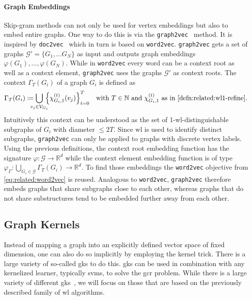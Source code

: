\paragraph{Graph Embeddings}
Skip-gram methods can not only be used for vertex embeddings but also to embed entire graphs.
One way to do this is via the \texttt{graph2vec}~\cite{Narayanan2017} method.
It is inspired by \texttt{doc2vec}~\cite{Le2014} which in turn is based on \texttt{word2vec}.
\texttt{graph2vec} gets a set of graphs $\mathcal{G}' = \{ G_1, \dots G_N \}$ as input and outputs graph embeddings $\varphi(G_1), \dots, \varphi(G_N)$.
While in \texttt{word2vec} every word can be a context root as well as a context element, \texttt{graph2vec} uses the graphs $\mathcal{G}'$ as context roots.
The context $\Gamma_T(G_i)$ of a graph $G_i$ is defined as
\begin{equation}
	\Gamma_T(G_i) \coloneqq \bigcup_{\mathclap{v_j \in \mathcal{V}_{G_i}}}\, {\left\{ \chi_{G_i, 1}^{(t)}(v_j) \right\}}_{t = 0}^T %
	\quad\text{with $T \in \mathbb{N}$ and $\chi_{G_i, 1}^{(t)}$ as in \cref{defn:related:wl1-refine}.}
\end{equation}
Intuitively this context can be understood as the set of 1-\acs{wl}-distinguishable subgraphs of $G_i$ with diameter $\leq 2T$.
Since \ac{wl} is used to identify distinct subgraphs, \texttt{graph2vec} can only be applied to graphs with discrete vertex labels.
Using the previous definitions, the context root embedding function has the signature $\varphi: \mathcal{G} \to \mathbb{R}^d$ while the context element embedding function is of type $\varphi_{\Gamma}: \bigcup_{G_i \in \mathcal{G}} \Gamma_T(G_i) \to \mathbb{R}^d$.
To find those embeddings the \texttt{word2vec} objective from \cref{eq:related:word2vec} is reused.
Analogous to \texttt{word2vec}, \texttt{graph2vec} therefore embeds graphs that share subgraphs close to each other, whereas graphs that do not share substructures tend to be embedded further away from each other.

\subsection{Graph Kernels}%
\label{sec:related:gcr:kernel}

Instead of mapping a graph into an explicitly defined vector space of fixed dimension, one can also do so implicitly by employing the kernel trick.
There is a large variety of so-called \acp{gk} to do this.
\acp{gk} can be used in combination with any kernelized learner, typically \acp{svm}, to solve the \ac{gcr} problem.
While there is a large variety of different \acp{gk}~\cite{Kriege2020}, we will focus on those that are based on the previously described family of \ac{wl} algorithms.

